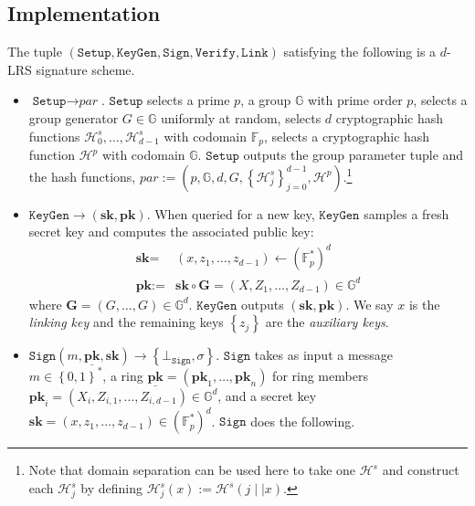 \documentclass[draft]{llncs} %
\begin{document}
\subsection{Implementation}\label{sec:implementation}
\begin{definition}[$d$-CLSAG]\label{def:clsag}
The tuple $(\texttt{Setup}, \texttt{KeyGen}, \texttt{Sign}, \texttt{Verify}, \allowbreak \texttt{Link})$ satisfying the following is a $d$-LRS signature scheme.

\begin{itemize}
\item $\texttt{Setup} \to \textit{par}$. $\texttt{Setup}$ selects a prime $p$, a group $\mathbb{G}$ with prime order $p$, selects a group generator $G \in \mathbb{G}$ uniformly at random, selects $d$ cryptographic hash functions $\mathcal{H}^s_0, \ldots, \mathcal{H}^s_{d-1}$ with codomain $\mathbb{F}_p$, selects a cryptographic hash function $\mathcal{H}^p$ with codomain $\mathbb{G}$. $\texttt{Setup}$ outputs the group parameter tuple and the hash functions, $\textit{par} := \left(p,\mathbb{G}, d, G, \left\{\mathcal{H}^s_j\right\}_{j=0}^{d-1}, \mathcal{H}^p\right)$.\footnote{Note that domain separation can be used here to take one $\mathcal{H}^s$ and construct each $\mathcal{H}^s_j$ by defining $\mathcal{H}^s_j(x) := \mathcal{H}^s(j \mid\mid x)$.}

\item $\texttt{KeyGen} \to (\textbf{sk}, \textbf{pk})$. When queried for a new key, $\texttt{KeyGen}$ samples a fresh secret key and computes the associated public key:
\begin{align*}
\textbf{sk} =& (x, z_1, \ldots, z_{d-1}) \leftarrow (\mathbb{F}_p^*)^d\\
\textbf{pk} :=& \textbf{sk} \circ \textbf{G} = (X, Z_1, \ldots, Z_{d-1}) \in \mathbb{G}^d
\end{align*} where $\textbf{G} = (G, \ldots, G) \in \mathbb{G}^d$. $\texttt{KeyGen}$ outputs $(\textbf{sk}, \textbf{pk})$. We say $x$ is the \textit{linking key} and the remaining keys $\left\{z_j\right\}$ are the \textit{auxiliary keys}.

\item $\texttt{Sign}\left(m, \underline{\textbf{pk}}, \textbf{sk}\right) \to \left\{\bot_{\texttt{Sign}}, \sigma\right\}$. $\texttt{Sign}$ takes as input a message $m \in \left\{0,1\right\}^*$, a ring  $\underline{\textbf{pk}} = (\textbf{pk}_1, \ldots, \textbf{pk}_n)$ for ring members $\textbf{pk}_i = (X_i, Z_{i,1}, \ldots, Z_{i,d-1}) \in \mathbb{G}^d$, and a secret key $\textbf{sk} = (x,z_1, \ldots, z_{d-1}) \in (\mathbb{F}_p^*)^d$. $\texttt{Sign}$ does the following.


\end{itemize}
\end{definition}
\end{document}
